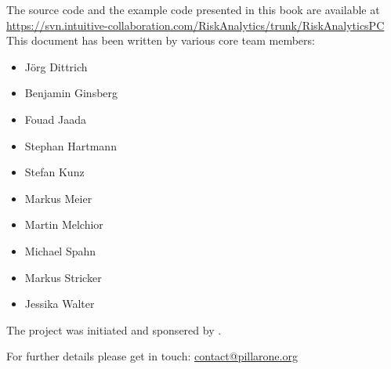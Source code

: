 \begin{titlepage}
\begin{flushleft}
{{The \RA{} source code and the example code presented in this book are available %
at\\
\url{https://svn.intuitive-collaboration.com/RiskAnalytics/trunk/RiskAnalyticsPC}\\[1cm]

This document has been written by various \PO{} core team members:
\begin{itemize}\tightitemize{0pt}
	\item J\"org Dittrich
	\item Benjamin Ginsberg
	\item Fouad Jaada
	\item Stephan Hartmann
	\item Stefan Kunz
	\item Markus Meier
	\item	Martin Melchior
	\item Michael Spahn
	\item Markus Stricker
	\item Jessika Walter
\end{itemize}
\vspace*{1cm}

The \PO{} project was initiated and sponsered by \MR.
}}

\vspace*{1cm}

For further details please get in touch: \href{mailto:contact@pillarone.org}{contact@pillarone.org}

\end{flushleft}
\end{titlepage}




